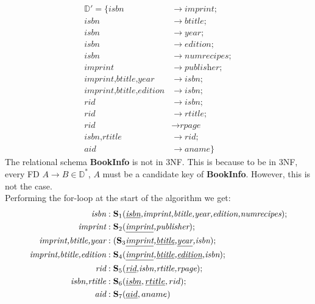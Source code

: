 \documentclass[letterpaper]{article}
\theoremstyle{plain}
\theoremstyle{definition}
\theoremstyle{remark}
\begin{document}
\subsubsection{}
\begin{align*}
    \mathbb{D}'=\{\textit{isbn}&\to \textit{imprint};\\
    \textit{isbn}&\to \textit{btitle};\\
    \textit{isbn}&\to \textit{year};\\
    \textit{isbn}&\to \textit{edition};\\
    \textit{isbn}&\to \textit{numrecipes};\\
    \textit{imprint}&\to \textit{publisher};\\
    \textit{imprint,btitle,year}&\to \textit{isbn};\\
    \textit{imprint,btitle,edition}&\to \textit{isbn};\\
    \textit{rid}&\to \textit{isbn};\\
    \textit{rid}&\to \textit{rtitle};\\
    \textit{rid}&\to \textit{rpage}\\
    \textit{isbn,rtitle}&\to \textit{rid};\\
    \textit{aid}&\to \textit{aname}\}
\end{align*}
The relational schema \textbf{BookInfo} is not in 3NF. This is because to be in 3NF, every FD $A\to B\in\mathbb{D}^*$, $A$ must be a candidate key of \textbf{BookInfo}. However, this is not the case.\\[1em]
Performing the for-loop at the start of the algorithm we get:
\begin{align*}
    \textit{isbn}&: \textbf{S}_1 (\textit{\underline{isbn},imprint,btitle,year,edition,numrecipes});\\
    \textit{imprint}&: \textbf{S}_2 (\textit{\underline{imprint},publisher});\\
    \textit{imprint,btitle,year}&: (\textbf{S}_3 \textit{\underline{imprint},\underline{btitle},\underline{year},isbn});\\
    \textit{imprint,btitle,edition}&: \textbf{S}_4 (\textit{\underline{imprint},\underline{btitle},\underline{{edition}},isbn});\\
    \textit{rid}&: \textbf{S}_5 (\textit{\underline{rid},isbn,rtitle,rpage});\\
    \textit{isbn,rtitle}&: \textbf{S}_6 (\underline{isbn},\underline{rtitle},rid);\\
    \textit{aid}&: \textbf{S}_7 (\underline{aid},aname)
\end{align*}
\end{document}
